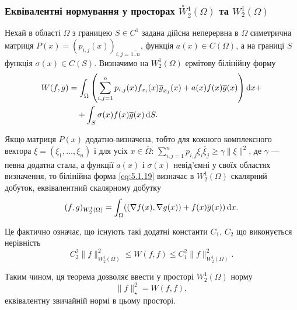 \subsubsection{Еквівалентні нормування у просторах \texorpdfstring{$\overset{\circ}{W} {}_2^1(\Omega)$}{W21oOmega} та \texorpdfstring{$W_2^1(\Omega)$}{W21Omega}}

Нехай в області $\Omega$ з границею $S \in C^1$ задана дійсна неперервна в $\overline{\Omega}$ симетрична матриця $P(x) = (p_{i,j}(x))_{i,j=\overline{1..n}}$, функція $a(x) \in C(\Omega)$, а на границі $S$ функція $\sigma(x) \in C(S)$. Визначимо на $W_2^1(\Omega)$ ермітову білінійну форму 
\begin{equation}
    \label{eq:5.1.19}
    \begin{aligned}
        W(f, g)
        &= \int_\Omega \left( \sum_{i,j=1}^n p_{i,j}(x) f_{x_i}(x) \overline{g}_{x_j}(x) + a(x) f(x) \overline{g}(x) \right) \mathop{}\!\mathrm{d} x + \\
        &\quad + \int_S \sigma(x) f(x) \overline{g}(x) \mathop{}\!\mathrm{d} S.
    \end{aligned}
\end{equation}

\begin{theorem}
    Якщо матриця $P(x)$ додатно-визначена, тобто для кожного комплексного вектора $\xi = (\xi_1, \ldots, \xi_n)$ і для усіх $x \in \overline{\Omega}$: $\sum_{i,j=1}^n p_{i,j} \xi_i \overline{\xi}_j \ge \gamma \|\xi\|^2$, де $\gamma$ --- певна додатна стала, а функції $a(x)$ і $\sigma(x)$ невід'ємні у своїх областях визначення, то білінійна форма \eqref{eq:5.1.19} визначає в $W_2^1(\Omega)$ скалярний добуток, еквівалентний скалярному добутку
    \begin{equation}
        \label{eq:5.1.20}
        (f, g)_{W_2^1(\Omega)} = \int_\Omega ((\nabla f(x), \nabla g(x)) + f(x) \overline{g}(x)) \mathop{}\!\mathrm{d} x.
    \end{equation}
\end{theorem}

\begin{remark}
    Це фактично означає, що існують такі додатні константи $C_1$, $C_2$ що виконується нерівність
    \begin{equation}
        \label{eq:5.1.21}
        C_2^2 \|f\|_{W_2^1(\Omega)}^2 \le W(f, f) \le C_1^2 \|f\|_{W_2^1(\Omega)}^2.
    \end{equation}
\end{remark}

\begin{remark}
    Таким чином, ця теорема дозволяє ввести у просторі $W_2^1(\Omega)$ норму
    \begin{equation}
        \label{eq:5.1.22}
        \|f\|_\star^2 = W(f, f),
    \end{equation}
    еквівалентну звичайній нормі в цьому просторі.
\end{remark}

